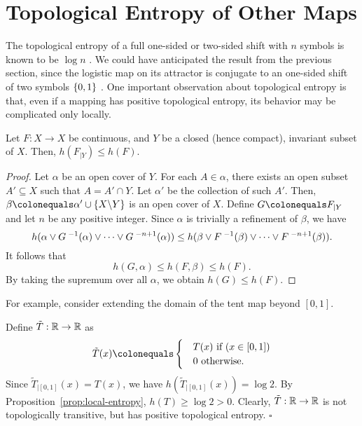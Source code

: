 \documentclass[10pt,twoside,draft]{book}
\begin{document}
\section{Topological Entropy of Other Maps}
The topological entropy of a full one-sided or two-sided shift with $n$ symbols is known to be $\log n$ \citep[p.177]{walters}.
We could have anticipated the result from the previous section, since the logistic map on its attractor is conjugate to an one-sided shift of two symbols $\left \{ 0,1 \right \}$ \citep{sternberg}.
One important observation about topological entropy is that, even if a mapping has positive topological entropy, its behavior may be complicated only locally.
\begin{proposition}
  Let $F: X \to X$ be continuous, and $Y$ be a closed (hence compact), invariant subset of $X$.
  Then, $h(F_{|Y}) \leq h(F)$.
  \label{prop:local-entropy}
  \begin{proof}
    Let $\alpha$ be an open cover of $Y$.
    For each $A \in \alpha$, there exists an open subset $A' \subseteq X$ such that $A = A' \cap Y$.
    Let $\alpha'$ be the collection of such $A'$.
    Then, $\beta \ceq \alpha' \cup \set{X\bs Y}$ is an open cover of $X$.
    Define $G \ceq F_{|Y}$ and let $n$ be any positive integer.
    Since $\alpha$ is trivially a refinement of $\beta$, we have
    \begin{equation*}
      h(\alpha \vee G^{\;-1}(\alpha) \vee \cdots \vee G^{\;-n+1}(\alpha)) 
      \leq
      h(\beta \vee F^{\;-1}(\beta) \vee \cdots \vee F^{\;-n+1}(\beta)).
    \end{equation*}
    It follows that
    \begin{equation*}
      h(G, \alpha) \leq h(F, \beta) \leq h(F).
    \end{equation*}
    By taking the supremum over all $\alpha$, we obtain $h(G) \leq h(F)$.
  \end{proof}
\end{proposition}
For example, consider extending the domain of the tent map beyond $[0,1]$.
\begin{example}
  Define $\tilde{T}: \mathbb{R} \to \mathbb{R}$ as
  \begin{equation*}
    \tilde{T}(x) 
    \ceq \begin{cases}
      &T(x) \mbox{ if } (x \in [0,1]) \\
      &0 \mbox{ otherwise}.
    \end{cases}
  \end{equation*}
  Since $\tilde{T}_{|[0,1]}(x) = T(x)$, we have $h(\tilde{T}_{|[0,1]}(x)) = \log 2$. 
  By Proposition~\ref{prop:local-entropy}, $h(T) \geq \log 2 > 0$.
  Clearly, $\tilde{T}: \mathbb{R} \to \mathbb{R}$ is not topologically transitive, but has positive topological entropy.
  $\square$
\end{example}
\end{document}
